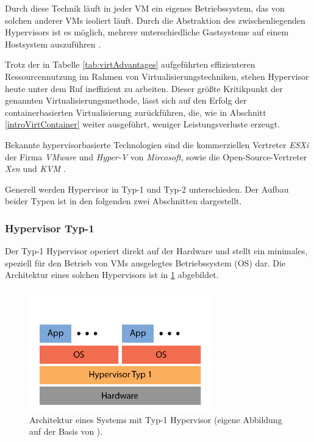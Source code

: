 \documentclass[../main.tex]{subfiles}
\begin{document}
      Durch diese Technik läuft in jeder \acrshort{VM} ein eigenes Betriebssystem, das von solchen anderer \acrshort{VM}s isoliert läuft. Durch die Abstraktion des zwischenliegenden Hypervisors ist es möglich, mehrere unterschiedliche Gastsysteme auf einem Hostsystem auszuführen \cite[S.2]{containerVirtPerformance}\cite[S.106]{tanenbaumOS}.

			Trotz der in Tabelle \ref{tab:virtAdvantages} aufgeführten effizienteren Ressourcennutzung im Rahmen von Virtualisierungstechniken, stehen Hypervisor heute unter dem Ruf ineffizient zu arbeiten. Dieser größte Kritikpunkt der genannten Virtualisierungsmethode, lässt sich auf den Erfolg der containerbasierten Virtualisierung zurückführen, die, wie in Abschnitt \ref{introVirtContainer} weiter ausgeführt, weniger Leistungsverluste erzeugt.

			Bekannte hypervisorbasierte Technologien sind die kommerziellen Vertreter \emph{ESXi} der Firma \emph{VMware} und \emph{Hyper-V} von \emph{Mircosoft}, sowie die Open-Source-Vertreter \emph{Xen} und \emph{KVM} \cite[S.1]{dockerLXCKub}.

      Generell werden Hypervisor in Typ-1 und Typ-2 unterschieden. Der Aufbau beider Typen ist in den folgenden zwei Abschnitten dargestellt.


			\subsubsection{Hypervisor Typ-1}
				Der Typ-1 Hypervisor operiert direkt auf der Hardware und stellt ein minimales, speziell für den Betrieb von VMs ausgelegtes Betriebssystem (\acrshort{OS}) dar. Die Architektur eines solchen Hypervisors ist in \fig \ref{fig:intro_hypervisor1} abgebildet.

				\begin{figure}[h]
	          \centering
	          \includegraphics[width=0.7\textwidth]{./images/intro_hypervisor1.png}
	          \caption{Architektur eines Systems mit Typ-1 Hypervisor (eigene Abbildung auf der Basis von \cite[S.107]{tanenbaumOS}).}
	          \label{fig:intro_hypervisor1}
	      \end{figure}
\end{document}
